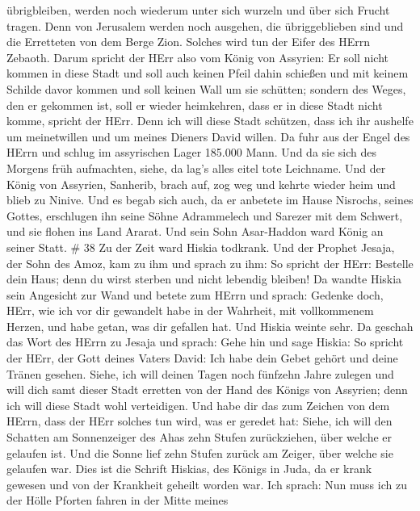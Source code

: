 übrigbleiben, werden noch wiederum unter sich wurzeln und über sich
Frucht tragen.  Denn von Jerusalem werden noch ausgehen,
die übriggeblieben sind und die Erretteten von dem Berge Zion. Solches
wird tun der Eifer des HErrn Zebaoth.  Darum spricht der
HErr also vom König von Assyrien: Er soll nicht kommen in diese Stadt
und soll auch keinen Pfeil dahin schießen und mit keinem Schilde davor
kommen und soll keinen Wall um sie schütten;  sondern des
Weges, den er gekommen ist, soll er wieder heimkehren, dass er in diese
Stadt nicht komme, spricht der HErr.  Denn ich will diese
Stadt schützen, dass ich ihr aushelfe um meinetwillen und um meines
Dieners David willen.  Da fuhr aus der Engel des HErrn und
schlug im assyrischen Lager 185.000 Mann. Und da sie sich des Morgens
früh aufmachten, siehe, da lag's alles eitel tote Leichname.
 Und der König von Assyrien, Sanherib, brach auf, zog weg
und kehrte wieder heim und blieb zu Ninive.  Und es begab
sich auch, da er anbetete im Hause Nisrochs, seines Gottes, erschlugen
ihn seine Söhne Adrammelech und Sarezer mit dem Schwert, und sie flohen
ins Land Ararat. Und sein Sohn Asar-Haddon ward König an seiner Statt.
\# 38  Zu der Zeit ward Hiskia todkrank. Und der Prophet
Jesaja, der Sohn des Amoz, kam zu ihm und sprach zu ihm: So spricht der
HErr: Bestelle dein Haus; denn du wirst sterben und nicht lebendig
bleiben!  Da wandte Hiskia sein Angesicht zur Wand und
betete zum HErrn  und sprach: Gedenke doch, HErr, wie ich
vor dir gewandelt habe in der Wahrheit, mit vollkommenem Herzen, und
habe getan, was dir gefallen hat. Und Hiskia weinte sehr. 
Da geschah das Wort des HErrn zu Jesaja und sprach:  Gehe
hin und sage Hiskia: So spricht der HErr, der Gott deines Vaters David:
Ich habe dein Gebet gehört und deine Tränen gesehen. Siehe, ich will
deinen Tagen noch fünfzehn Jahre zulegen  und will dich samt
dieser Stadt erretten von der Hand des Königs von Assyrien; denn ich
will diese Stadt wohl verteidigen.  Und habe dir das zum
Zeichen von dem HErrn, dass der HErr solches tun wird, was er geredet
hat:  Siehe, ich will den Schatten am Sonnenzeiger des Ahas
zehn Stufen zurückziehen, über welche er gelaufen ist. Und die Sonne
lief zehn Stufen zurück am Zeiger, über welche sie gelaufen war.
 Dies ist die Schrift Hiskias, des Königs in Juda, da er
krank gewesen und von der Krankheit geheilt worden war. 
Ich sprach: Nun muss ich zu der Hölle Pforten fahren in der Mitte meines
